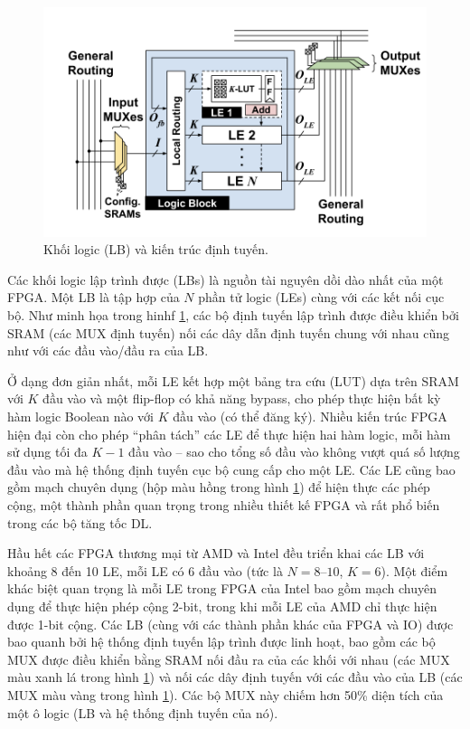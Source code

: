 \documentclass[a4paper]{article}
\begin{document}
\begin{figure}[!h]
    \centering
    \includegraphics[width=0.75\linewidth]{assets/fpga_7.png}
    \caption{Khối logic (LB) và kiến trúc định tuyến.}
    \label{fig:fpga_7}
\end{figure}

Các khối logic lập trình được (LBs) là nguồn tài nguyên dồi dào nhất của một FPGA. Một LB là tập hợp của $N$ phần tử logic (LEs) cùng với các kết nối cục bộ. Như minh họa trong hinhf \ref{fig:fpga_7}, các bộ định tuyến lập trình được điều khiển bởi SRAM (các MUX định tuyến) nối các dây dẫn định tuyến chung với nhau cũng như với các đầu vào/đầu ra của LB.

Ở dạng đơn giản nhất, mỗi LE kết hợp một bảng tra cứu (LUT) dựa trên SRAM với $K$ đầu vào và một flip-flop có khả năng bypass, cho phép thực hiện bất kỳ hàm logic Boolean nào với $K$ đầu vào (có thể đăng ký). Nhiều kiến trúc FPGA hiện đại còn cho phép “phân tách” các LE để thực hiện hai hàm logic, mỗi hàm sử dụng tối đa $K-1$ đầu vào – sao cho tổng số đầu vào không vượt quá số lượng đầu vào mà hệ thống định tuyến cục bộ cung cấp cho một LE. Các LE cũng bao gồm mạch chuyên dụng (hộp màu hồng trong hình \ref{fig:fpga_7}) để hiện thực các phép cộng, một thành phần quan trọng trong nhiều thiết kế FPGA và rất phổ biến trong các bộ tăng tốc DL.

Hầu hết các FPGA thương mại từ AMD và Intel đều triển khai các LB với khoảng 8 đến 10 LE, mỗi LE có 6 đầu vào (tức là $N = 8\text{–}10$, $K = 6$). Một điểm khác biệt quan trọng là mỗi LE trong FPGA của Intel bao gồm mạch chuyên dụng để thực hiện phép cộng 2-bit, trong khi mỗi LE của AMD chỉ thực hiện được 1-bit cộng. Các LB (cùng với các thành phần khác của FPGA và IO) được bao quanh bởi hệ thống định tuyến lập trình được linh hoạt, bao gồm các bộ MUX được điều khiển bằng SRAM nối đầu ra của các khối với nhau (các MUX màu xanh lá trong hình \ref{fig:fpga_7}) và nối các dây định tuyến với các đầu vào của LB (các MUX màu vàng trong hình \ref{fig:fpga_7}). Các bộ MUX này chiếm hơn 50\% diện tích của một ô logic (LB và hệ thống định tuyến của nó).
\end{document}
